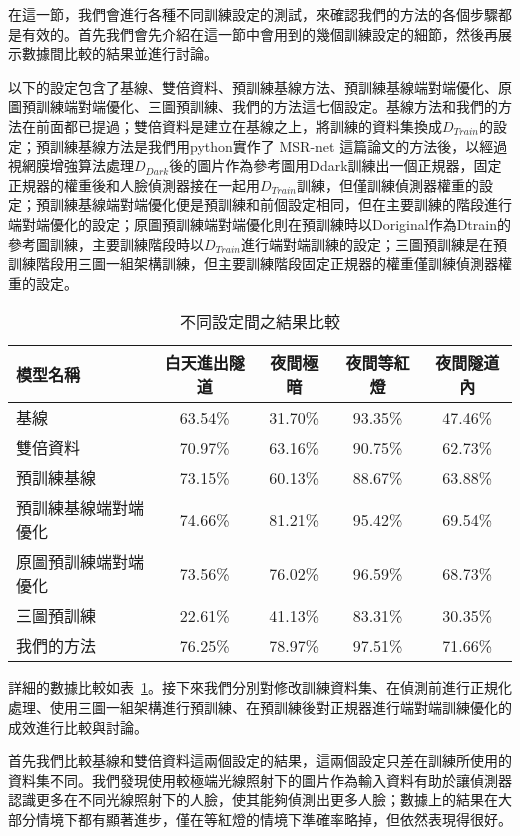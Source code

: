 在這一節，我們會進行各種不同訓練設定的測試，來確認我們的方法的各個步驟都是有效的。首先我們會先介紹在這一節中會用到的幾個訓練設定的細節，然後再展示數據間比較的結果並進行討論。

以下的設定包含了基線、雙倍資料、預訓練基線方法、預訓練基線端對端優化、原圖預訓練端對端優化、三圖預訓練、我們的方法這七個設定。基線方法和我們的方法在前面都已提過；雙倍資料是建立在基線之上，將訓練的資料集換成$D_{Train}$的設定；預訓練基線方法是我們用python實作了 MSR-net 這篇論文的方法後，以經過視網膜增強算法處理$D_{Dark}$後的圖片作為參考圖用Ddark訓練出一個正規器，固定正規器的權重後和人臉偵測器接在一起用$D_{Train}$訓練，但僅訓練偵測器權重的設定；預訓練基線端對端優化便是預訓練和前個設定相同，但在主要訓練的階段進行端對端優化的設定；原圖預訓練端對端優化則在預訓練時以Doriginal作為Dtrain的參考圖訓練，主要訓練階段時以$D_{Train}$進行端對端訓練的設定；三圖預訓練是在預訓練階段用三圖一組架構訓練，但主要訓練階段固定正規器的權重僅訓練偵測器權重的設定。
\begin{table}[ht]
    \caption{不同設定間之結果比較}
    \centering
    \begin{tabular}{l c c c c}
        \hline
        模型名稱 & 白天進出隧道 & 夜間極暗 & 夜間等紅燈 & 夜間隧道內 \\
        \hline
        基線 & 63.54\% & 31.70\% & 93.35\% & 47.46\% \\
        雙倍資料 & 70.97\% & 63.16\% & 90.75\% & 62.73\% \\
        預訓練基線 & 73.15\% & 60.13\% & 88.67\% & 63.88\% \\
        預訓練基線端對端優化 & 74.66\% & 81.21\% &95.42\% & 69.54\% \\
        原圖預訓練端對端優化 & 73.56\% & 76.02\% & 96.59\% & 68.73\% \\
        三圖預訓練 & 22.61\% & 41.13\% & 83.31\% & 30.35\% \\
        我們的方法 & 76.25\% & 78.97\% & 97.51\% & 71.66\% \\
        \hline
    \end{tabular}
    \label{table:all_compare}
\end{table}
詳細的數據比較如表~\ref{table:all_compare}。接下來我們分別對修改訓練資料集、在偵測前進行正規化處理、使用三圖一組架構進行預訓練、在預訓練後對正規器進行端對端訓練優化的成效進行比較與討論。

首先我們比較基線和雙倍資料這兩個設定的結果，這兩個設定只差在訓練所使用的資料集不同。我們發現使用較極端光線照射下的圖片作為輸入資料有助於讓偵測器認識更多在不同光線照射下的人臉，使其能夠偵測出更多人臉；數據上的結果在大部分情境下都有顯著進步，僅在等紅燈的情境下準確率略掉，但依然表現得很好。

